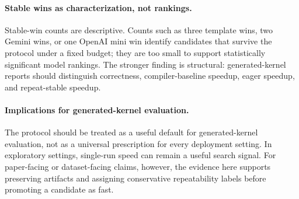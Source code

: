 \paragraph{Stable wins as characterization, not rankings.}
Stable-win counts are descriptive. Counts such as three template wins, two Gemini wins, or one OpenAI mini win identify candidates that survive the protocol under a fixed budget; they are too small to support statistically significant model rankings. The stronger finding is structural: generated-kernel reports should distinguish correctness, compiler-baseline speedup, eager speedup, and repeat-stable speedup.

\paragraph{Implications for generated-kernel evaluation.}
The protocol should be treated as a useful default for generated-kernel evaluation, not as a universal prescription for every deployment setting. In exploratory settings, single-run speed can remain a useful search signal. For paper-facing or dataset-facing claims, however, the evidence here supports preserving artifacts and assigning conservative repeatability labels before promoting a candidate as fast.

